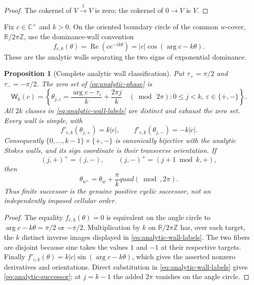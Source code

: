 \documentclass[11pt,a4paper]{amsart}
\theoremstyle{plain}
\newtheorem{proposition}[theorem]{Proposition}
\theoremstyle{definition}
\newcommand{\RR}{\mathbb R}
\newcommand{\CC}{\mathbb C}
\begin{document}
\begin{proof}
The cokernel of $V\xrightarrow{1}V$ is zero; the cokernel of $0\to V$ is $V$.
\end{proof}

Fix $c\in\CC^\times$ and $k>0$.  On the oriented boundary circle of the common $w$-cover,
$\RR/2\pi\mathbb Z$, use the dominance-wall convention
\begin{equation}\label{eq:analytic-phase}
 f_{c,k}(\theta)=\operatorname{Re}(ce^{-ik\theta})
  =|c|\cos(\arg c-k\theta).
\end{equation}
These are the analytic walls separating the two signs of exponential dominance.

\begin{proposition}[Complete analytic wall classification]\label{prop:analytic-walls}
Put $\tau_+=\pi/2$ and $\tau_-=-\pi/2$.  The zero set of \eqref{eq:analytic-phase} is
\begin{equation}\label{eq:analytic-wall-labels}
 \mathsf W_k(c)=\left\{
 \theta_{j,\varepsilon}=
 \frac{\arg c-\tau_\varepsilon}{k}+\frac{2\pi j}{k}\quad(\bmod\,2\pi):
 0\leq j<k,\ \varepsilon\in\{+,-\}\right\}.
\end{equation}
All $2k$ classes in \eqref{eq:analytic-wall-labels} are distinct and exhaust the zero set.  Every
wall is simple, with
\[
 f'_{c,k}(\theta_{j,+})=k|c|,
 \qquad f'_{c,k}(\theta_{j,-})=-k|c|.
\]
Consequently $\{0,\ldots,k-1\}\times\{+,-\}$ is canonically bijective with the analytic Stokes
walls, and its sign coordinate is their transverse orientation.  If
\[
 (j,+)^+=(j,-),\qquad (j,-)^+=(j+1\bmod k,+),
\]
then
\begin{equation}\label{eq:analytic-successor}
                       \theta_{w^+}=\theta_w+\frac{\pi}{k}quad(\bmod,2\pi).
\end{equation}
Thus finite successor is the genuine positive cyclic successor, not an independently imposed
cellular order.
\end{proposition}

\begin{proof}
The equality $f_{c,k}(\theta)=0$ is equivalent on the angle circle to
$\arg c-k\theta=\pi/2$ or $-\pi/2$.  Multiplication by $k$ on
$\RR/2\pi\mathbb Z$ has, over each target, the $k$ distinct inverse images displayed in
\eqref{eq:analytic-wall-labels}.  The two fibers are disjoint because sine takes the values $1$
and $-1$ at their respective targets.  Finally
$f'_{c,k}(\theta)=k|c|\sin(\arg c-k\theta)$, which gives the asserted nonzero derivatives and
orientations.  Direct substitution in \eqref{eq:analytic-wall-labels} gives
\eqref{eq:analytic-successor}; at $j=k-1$ the added $2\pi$ vanishes on the angle circle.
\end{proof}
\end{document}
